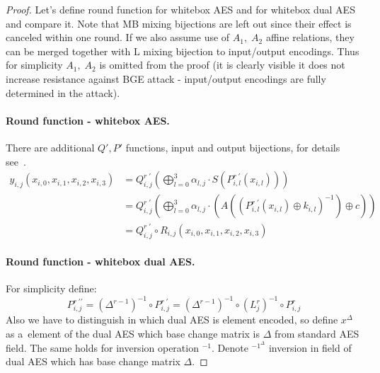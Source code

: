 \documentclass[11pt,oneside,final]{fithesis2}
\begin{document}
	\begin{proof}
	Let's define round function for whitebox AES and for whitebox dual AES and compare it. 
	Note that MB mixing bijections are left out since their effect is canceled within one round. If we also assume use of $A_1, \; A_2$ affine relations,
	they can be merged together with L mixing bijection to input/output encodings. Thus for simplicity $A_1, \; A_2$ is omitted from the proof (it is clearly visible 
	it does not increase resistance against BGE attack - input/output encodings are fully determined in the attack).

	\paragraph*{Round function - whitebox AES.}
	There are additional $Q' ,P' $ functions, input and output bijections, for details see~\citep{Chow02white-boxcryptography, Billet:2004:CWB:2080787.2080809}.
	\begin{subequations}
	\begin{align} 
	y_{i,j}\left(x_{i,0}, x_{i,1}, x_{i,2}, x_{i,3}\right)  &= Q^{r \; \prime}_{i,j}\left( \bigoplus^3_{l=0} \alpha_{l,j} \cdot S \left(P^{r \; \prime}_{i,l}\left(x_{i,l}\right) \right) \right) \\
								&= Q^{r \; \prime}_{i,j}\left( \bigoplus^3_{l=0} \alpha_{l,j} \cdot \left( A \left( \left(P^{r \; \prime}_{i,l}\left(x_{i,l}\right) \oplus k_{i,l} \right)^{-1} \right) \oplus c \right) \right) \\
								&= Q^{r \; \prime}_{i,j} \circ R_{i,j}\left(x_{i,0}, x_{i,1}, x_{i,2}, x_{i,3}\right) \label{eq:whitebox_aes_roud}
	\end{align}
	\end{subequations}

	\paragraph*{Round function - whitebox dual AES.}
	For simplicity define:
	\begin{equation}
	    P^{r \; \prime\prime}_{i,j} = \left(\Delta^{r-1}\right)^{-1} \circ P^{r \; \prime}_{i,j} = \left(\Delta^{r-1}\right)^{-1} \circ (L^{r}_{j})^{-1} \circ P^{r}_{i,j} \label{eq:ioencoding_abstract_p}
	\end{equation}
	Also we have to distinguish in which dual AES is element encoded, so define $x^{\Delta}$ as a~element of the dual AES which base change matrix is $\Delta$ from standard AES field. 
	The same holds for inversion operation $^{-1}$. Denote $^{-1^{\Delta}}$ inversion in field of dual AES which has base change matrix $\Delta$.
	

\end{proof}
\end{document}
